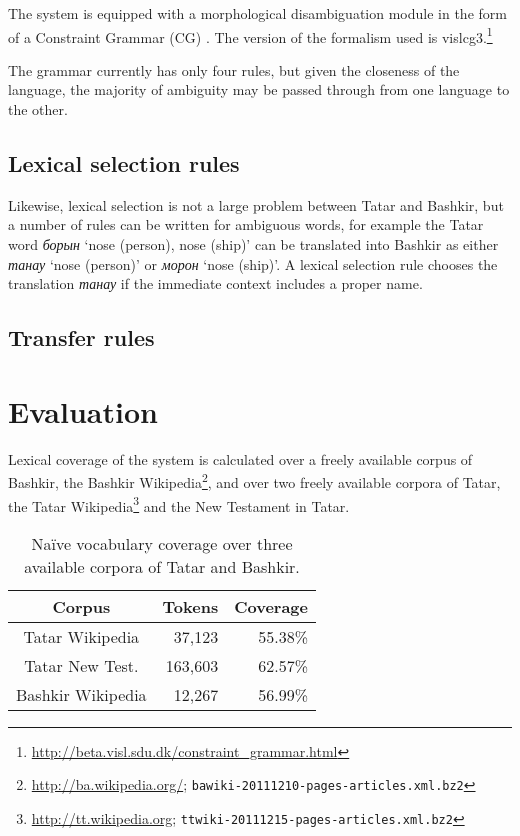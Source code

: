 \documentclass[11pt,a4paper]{article}
\begin{document}
The system is equipped with a morphological disambiguation module in the form of a 
Constraint Grammar (CG) \cite{karlsson95}. The version of the formalism used is 
vislcg3.\footnote{\url{http://beta.visl.sdu.dk/constraint_grammar.html}}

The grammar currently has only four rules, but given the closeness of the language, the 
majority of ambiguity may be passed through from one language to the other.

\subsection{Lexical selection rules}

Likewise, lexical selection is not a large problem between Tatar and Bashkir, but a 
number of rules can be written for ambiguous words, for example the Tatar 
word \emph{борын} `nose (person), nose (ship)' can be translated into Bashkir 
as either \emph{танау} `nose (person)' or \emph{морон} `nose (ship)'. A lexical selection
rule chooses the translation \emph{танау} if the immediate context includes a proper 
name.

\subsection{Transfer rules}


\section{Evaluation}
\label{sec:eval}

Lexical coverage of the system is calculated over a freely available corpus of Bashkir, the Bashkir
Wikipedia\footnote{\url{http://ba.wikipedia.org/}; {\tt bawiki-20111210-pages-articles.xml.bz2}}, and over two freely available corpora of 
Tatar, the Tatar Wikipedia\footnote{\url{http://tt.wikipedia.org}; {\tt ttwiki-20111215-pages-articles.xml.bz2}} and the New Testament in Tatar.

\begin{table}
  \begin{center}
  \begin{tabular}{c|r|r}
   Corpus                  & Tokens    & Coverage\\
   \hline
   Tatar Wikipedia         & 37,123    & 55.38\% \\
   Tatar New Test.         & 163,603   & 62.57\% \\
   \hline
   Bashkir Wikipedia       & 12,267    & 56.99\% \\
   \hline
  \end{tabular}
    \caption{Na\"ive vocabulary coverage over three available corpora of Tatar and Bashkir.}
    \label{table:coverage}
  \end{center}
\end{table}
\end{document}

